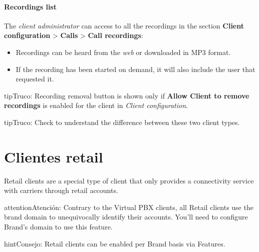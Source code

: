 \documentclass[letterpaper,10pt,spanish]{sphinxmanual}
\begin{document}
\paragraph{Recordings list}
\label{administration_portal/client/residential/calls/call_recordings:recordings-list}
The \emph{client administrator} can access to all the recordings in the section
\textbf{Client configuration} \textgreater{} \textbf{Calls} \textgreater{} \textbf{Call recordings}:
\begin{itemize}
\item {} 
Recordings can be heard from the \emph{web} or downloaded in MP3 format.

\item {} 
If the recording has been started on demand, it will also include the user
that requested it.

\end{itemize}

\begin{notice}{tip}{Truco:}
Recording removal button is shown only if \textbf{Allow Client to remove recordings} is enabled
for the client in \emph{Client configuration}.
\end{notice}

\begin{notice}{tip}{Truco:}
Check {\hyperref[administration_portal/brand/clients/retail:differences\string-between\string-retail\string-and\string-residential\string-clients]{}} to understand the difference between these two
client types.
\end{notice}


\section{Clientes retail}
\label{administration_portal/client/retail/index:retail-clients}\label{administration_portal/client/retail/index::doc}
Retail clients are a special type of client that only provides a connectivity
service with carriers through retail accounts.

\begin{notice}{attention}{Atención:}
Contrary to the Virtual PBX clients, all Retail clients use the
brand domain to unequivocally identify their accounts. You'll need to configure
Brand's domain to use this feature.
\end{notice}

\begin{notice}{hint}{Consejo:}
Retail clients can be enabled per Brand basis via Features.
\end{notice}
\end{document}
